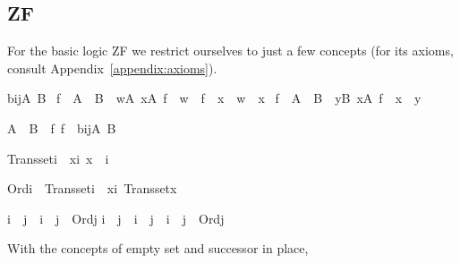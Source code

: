 \subsection{ZF\label{sec:def-main-ZF}%
}
For the basic logic ZF we restrict ourselves to just a few
concepts (for its axioms, consult Appendix~\ref{appendix:axioms}).
%
\begin{isabelle}%
bij{\isacharparenleft}{\kern0pt}A{\isacharcomma}{\kern0pt}\ B{\isacharparenright}{\kern0pt}\ {\isasymequiv}\isanewline
{\isacharbraceleft}{\kern0pt}f\ {\isasymin}\ A\ {\isasymrightarrow}\ B\ {\isachardot}{\kern0pt}\ {\isasymforall}w{\isasymin}A{\isachardot}{\kern0pt}\ {\isasymforall}x{\isasymin}A{\isachardot}{\kern0pt}\ f\ {\isacharbackquote}{\kern0pt}\ w\ {\isacharequal}{\kern0pt}\ f\ {\isacharbackquote}{\kern0pt}\ x\ {\isasymlongrightarrow}\ w\ {\isacharequal}{\kern0pt}\ x{\isacharbraceright}{\kern0pt}\ {\isasyminter}\isanewline
{\isacharbraceleft}{\kern0pt}f\ {\isasymin}\ A\ {\isasymrightarrow}\ B\ {\isachardot}{\kern0pt}\ {\isasymforall}y{\isasymin}B{\isachardot}{\kern0pt}\ {\isasymexists}x{\isasymin}A{\isachardot}{\kern0pt}\ f\ {\isacharbackquote}{\kern0pt}\ x\ {\isacharequal}{\kern0pt}\ y{\isacharbraceright}{\kern0pt}%
\end{isabelle}%
\begin{isabelle}%
A\ {\isasymapprox}\ B\ {\isasymequiv}\ {\isasymexists}f{\isachardot}{\kern0pt}\ f\ {\isasymin}\ bij{\isacharparenleft}{\kern0pt}A{\isacharcomma}{\kern0pt}\ B{\isacharparenright}{\kern0pt}%
\end{isabelle}%
\begin{isabelle}%
Transset{\isacharparenleft}{\kern0pt}i{\isacharparenright}{\kern0pt}\ {\isasymequiv}\ {\isasymforall}x{\isasymin}i{\isachardot}{\kern0pt}\ x\ {\isasymsubseteq}\ i%
\end{isabelle}%
\begin{isabelle}%
Ord{\isacharparenleft}{\kern0pt}i{\isacharparenright}{\kern0pt}\ {\isasymequiv}\ Transset{\isacharparenleft}{\kern0pt}i{\isacharparenright}{\kern0pt}\ {\isasymand}\ {\isacharparenleft}{\kern0pt}{\isasymforall}x{\isasymin}i{\isachardot}{\kern0pt}\ Transset{\isacharparenleft}{\kern0pt}x{\isacharparenright}{\kern0pt}{\isacharparenright}{\kern0pt}%
\end{isabelle}%
\begin{isabelle}%
i\ {\isacharless}{\kern0pt}\ j\ {\isasymequiv}\ i\ {\isasymin}\ j\ {\isasymand}\ Ord{\isacharparenleft}{\kern0pt}j{\isacharparenright}{\kern0pt}\isasep\isanewline%
i\ {\isasymle}\ j\ {\isasymlongleftrightarrow}\ i\ {\isacharless}{\kern0pt}\ j\ {\isasymor}\ i\ {\isacharequal}{\kern0pt}\ j\ {\isasymand}\ Ord{\isacharparenleft}{\kern0pt}j{\isacharparenright}{\kern0pt}%
\end{isabelle}%
With the concepts of empty set and successor in place,%


